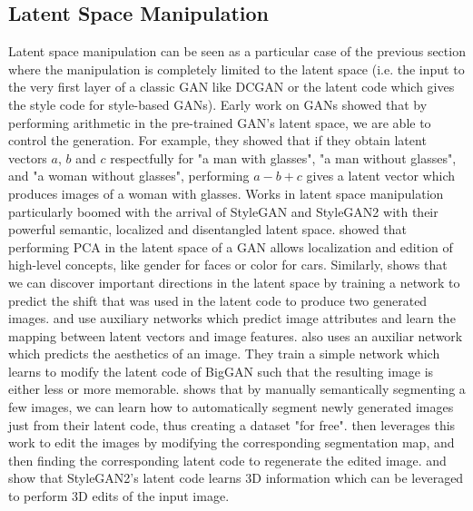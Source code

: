 \subsection{Latent Space Manipulation}\label{subsection:latent_space_manipulation}
Latent space manipulation can be seen as a particular case of the previous section where the manipulation 
is completely limited to the latent space (i.e. the input to the very first layer of a classic \ac{GAN}
like \ac{DCGAN} or the latent code which gives the style code for style-based \ac{GAN}s). 
Early work on \ac{GAN}s \citep{dcgan} showed that by performing arithmetic in the pre-trained 
\ac{GAN}'s latent space, we are able to control the generation. For example, they showed that
if they obtain latent vectors $a$, $b$ and $c$ respectfully for "a man with glasses", 
"a man without glasses", and "a woman without glasses", performing $a - b + c$ gives a latent 
vector which produces images of a woman with glasses. Works in latent space manipulation
 particularly boomed with the arrival of StyleGAN \citep{karra2019stylegan}
and StyleGAN2 \citep{karra2020stylegan2} with their powerful semantic, localized and 
disentangled latent space. \cite{harkonen2020ganspace} showed that performing PCA in the 
latent space of 
a \ac{GAN} allows localization and edition of high-level concepts, like gender for faces or 
color for cars. Similarly,
\cite{voynov20icml} shows that we can discover important directions in the latent space by 
training a network to predict the shift that was used in the latent code to produce two generated images. 
\cite{shen2020} and \cite{zhuang2021enjoy} use auxiliary networks 
which predict image attributes and learn the mapping between latent vectors and image features.
\cite{Goetschalckxganalyze} also uses an auxiliar network which predicts the aesthetics of an 
image. They train a simple network which learns to modify the latent code of BigGAN \citep{brock2018large}
such that the resulting image is either less or more memorable.
 \cite{zhang2021datasetgan}
shows that by manually semantically segmenting a few images, we can learn how to automatically 
segment newly generated images just from their latent code, thus creating a dataset "for free".
 \cite{ling2021editgan} then leverages this work to edit 
the images by modifying the corresponding segmentation map, and then finding the corresponding latent code to regenerate 
the edited image. \cite{tewari2020stylerig} and \cite{zhang2020image} show that StyleGAN2's latent code 
learns 3D information which can be leveraged to perform 3D edits of the input image.

